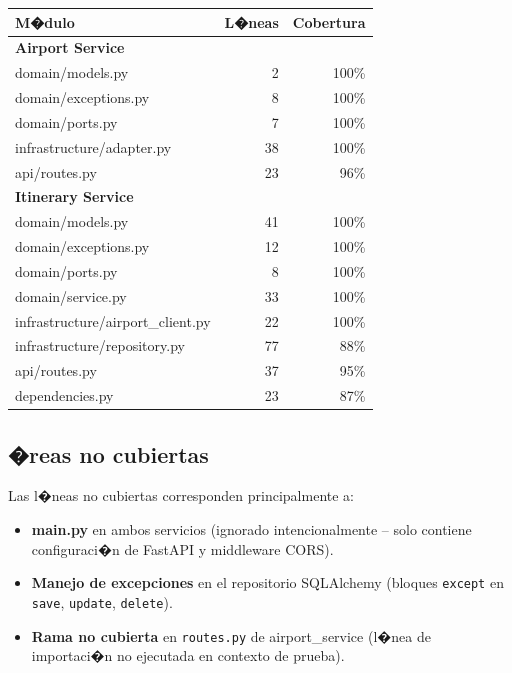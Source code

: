 \documentclass[12pt,a4paper]{article}
\begin{document}
\begin{longtable}{lrr}
  \toprule
  \textbf{M�dulo} & \textbf{L�neas} & \textbf{Cobertura} \\
  \midrule
  \endhead
  \bottomrule
  \endfoot
  \textbf{Airport Service} & & \\
  \hspace{0.5cm}domain/models.py & 2 & 100\% \\
  \hspace{0.5cm}domain/exceptions.py & 8 & 100\% \\
  \hspace{0.5cm}domain/ports.py & 7 & 100\% \\
  \hspace{0.5cm}infrastructure/adapter.py & 38 & 100\% \\
  \hspace{0.5cm}api/routes.py & 23 & 96\% \\
  \midrule
  \textbf{Itinerary Service} & & \\
  \hspace{0.5cm}domain/models.py & 41 & 100\% \\
  \hspace{0.5cm}domain/exceptions.py & 12 & 100\% \\
  \hspace{0.5cm}domain/ports.py & 8 & 100\% \\
  \hspace{0.5cm}domain/service.py & 33 & 100\% \\
  \hspace{0.5cm}infrastructure/airport\_client.py & 22 & 100\% \\
  \hspace{0.5cm}infrastructure/repository.py & 77 & 88\% \\
  \hspace{0.5cm}api/routes.py & 37 & 95\% \\
  \hspace{0.5cm}dependencies.py & 23 & 87\% \\
  \bottomrule
\end{longtable}

\subsection{�reas no cubiertas}

Las l�neas no cubiertas corresponden principalmente a:

\begin{itemize}
  \item \textbf{main.py} en ambos servicios (ignorado intencionalmente --
        solo contiene configuraci�n de FastAPI y middleware CORS).
  \item \textbf{Manejo de excepciones} en el repositorio SQLAlchemy
        (bloques \texttt{except} en \texttt{save}, \texttt{update}, \texttt{delete}).
  \item \textbf{Rama no cubierta} en \texttt{routes.py} de airport\_service
        (l�nea de importaci�n no ejecutada en contexto de prueba).
\end{itemize}
\end{document}
